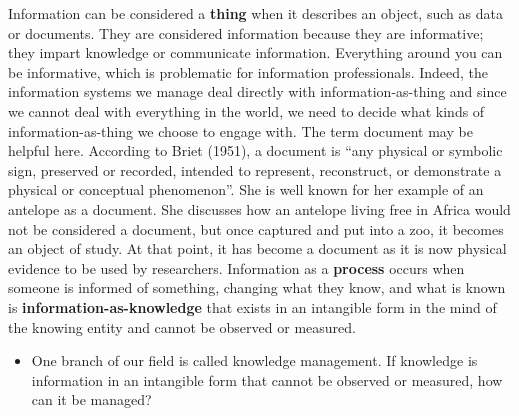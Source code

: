 \documentclass[
  letterpaper,
  DIV=11,
  numbers=noendperiod]{scrreprt}
\providecommand{\tightlist}{%
  \setlength{\itemsep}{0pt}\setlength{\parskip}{0pt}}
\begin{document}
Information can be considered a \textbf{thing} when it describes an
object, such as data or documents. They are considered information
because they are informative; they impart knowledge or communicate
information. Everything around you can be informative, which is
problematic for information professionals. Indeed, the information
systems we manage deal directly with information-as-thing and since we
cannot deal with everything in the world, we need to decide what kinds
of information-as-thing we choose to engage with. The term document may
be helpful here. According to Briet (1951), a document is ``any physical
or symbolic sign, preserved or recorded, intended to represent,
reconstruct, or demonstrate a physical or conceptual phenomenon''. She
is well known for her example of an antelope as a document. She
discusses how an antelope living free in Africa would not be considered
a document, but once captured and put into a zoo, it becomes an object
of study. At that point, it has become a document as it is now physical
evidence to be used by researchers. Information as a \textbf{process}
occurs when someone is informed of something, changing what they know,
and what is known is \textbf{information-as-knowledge} that exists in an
intangible form in the mind of the knowing entity and cannot be observed
or measured.

\begin{tcolorbox}[enhanced jigsaw, arc=.35mm, bottomrule=.15mm, bottomtitle=1mm, breakable, colback=white, colbacktitle=quarto-callout-tip-color!10!white, colframe=quarto-callout-tip-color-frame, coltitle=black, left=2mm, leftrule=.75mm, opacityback=0, opacitybacktitle=0.6, rightrule=.15mm, title=\textcolor{quarto-callout-tip-color}{\faLightbulb}\hspace{0.5em}{Stop and reflect}, titlerule=0mm, toprule=.15mm, toptitle=1mm]

\begin{itemize}
\tightlist
\item
  One branch of our field is called knowledge management. If knowledge
  is information in an intangible form that cannot be observed or
  measured, how can it be managed?
\end{itemize}

\end{tcolorbox}
\end{document}
